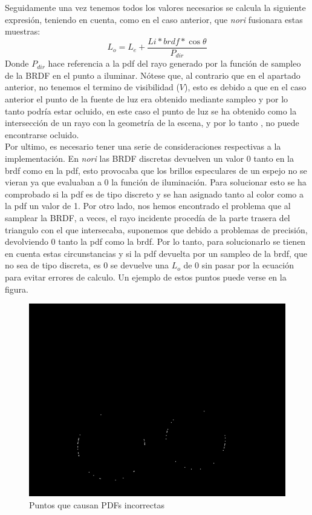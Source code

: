 \documentclass[10pt,oneside,a4paper]{article}
\begin{document}
Seguidamente una vez tenemos todos los valores necesarios se calcula la siguiente expresión, teniendo en cuenta, como en el caso anterior, que \textit{nori} fusionara estas muestras:
$$L_o = L_e + \frac{Li * brdf *\cos\theta}{P_{dir}}$$
Donde $P_{dir}$ hace referencia a la pdf del rayo generado por la función de sampleo de la BRDF en el punto a iluminar. Nótese que, al contrario que en el apartado anterior, no tenemos el termino de visibilidad ($V$), esto es debido a que en el caso anterior el punto de la fuente de luz era obtenido mediante sampleo y por lo tanto podría estar ocluido, en este caso el punto de luz se ha obtenido como la intersección de un rayo con la geometría de la escena, y por lo tanto , no puede encontrarse ocluido.\\

Por ultimo, es necesario tener una serie de consideraciones respectivas a la implementación. En \textit{nori} las BRDF discretas devuelven un valor 0 tanto en la brdf como en la pdf, esto provocaba que los brillos especulares de un espejo no se vieran ya que evaluaban a 0 la función de iluminación. Para solucionar esto se ha comprobado si la pdf es de tipo discreto y se han asignado tanto al color como a la pdf un valor de 1. Por otro lado, nos hemos encontrado el problema que al samplear la BRDF, a veces, el rayo incidente procedía de la parte trasera del triangulo con el que intersecaba, suponemos que debido a problemas de precisión, devolviendo 0 tanto la pdf como la brdf. Por lo tanto, para solucionarlo se tienen en cuenta estas circunstancias y si la pdf devuelta por un sampleo de la brdf, que no sea de tipo discreta,  es 0 se devuelve una $L_o$ de 0 sin pasar por la ecuación para evitar errores de calculo. Un ejemplo de estos puntos puede verse en la figura.

\begin{figure}[h]
\centering
\includegraphics[width=.6\linewidth]{images/pdfs_incorrectas.png}
\caption{Puntos que causan PDFs incorrectas}
\label{fig:diff_ems}
\end{figure}
\end{document}
